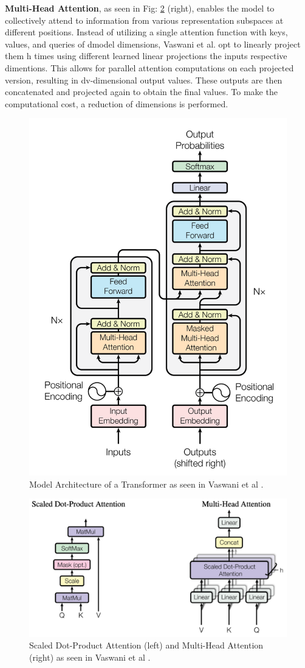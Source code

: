 \documentclass[UKenglish]{uiomasterthesis}
\begin{document}
\textbf{Multi-Head Attention}, as seen in Fig: \ref{fig:mha} (right), enables the model to collectively attend to information from various representation subspaces at different positions. Instead of utilizing a single attention function with keys, values, and queries of dmodel dimensions, Vaswani et al. opt to linearly project them h times using different learned linear projections the inputs respective dimentions. This allows for parallel attention computations on each projected version, resulting in dv-dimensional output values. These outputs are then concatenated and projected again to obtain the final values. To make the computational cost, a reduction of dimensions is performed.

\begin{figure}
    \centering
    \includegraphics[width=0.65\linewidth]{Figures/transformer.png}
    \caption{Model Architecture of a Transformer as seen in Vaswani et al \cite{vaswani_attention_2023}.}
    \label{fig:Transformer}
\end{figure}

\begin{figure}
    \centering
    \includegraphics[width=0.85\linewidth]{Figures/mha.png}
    \caption{Scaled Dot-Product Attention (left) and Multi-Head Attention (right) as seen in Vaswani et al \cite{vaswani_attention_2023}.}
    \label{fig:mha}
\end{figure}
\end{document}
